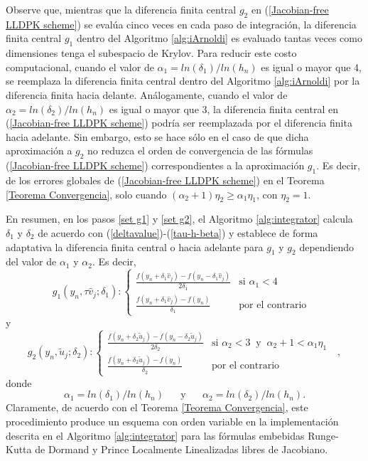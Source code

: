 Observe que, mientras que la diferencia finita central $g_2$ en (\ref{Jacobian-free LLDPK scheme}) se evalúa cinco veces en cada paso de integración, la diferencia finita central $g_1$ dentro del Algoritmo \ref{alg:iArnoldi} es evaluado tantas veces como dimensiones tenga el subespacio de Krylov. Para reducir este costo computacional, cuando el valor de $\alpha_1=ln(\delta_1)/ln(h_n)$ es igual o mayor que 4, se reemplaza la diferencia finita central dentro del Algoritmo \ref{alg:iArnoldi} por la diferencia finita hacia delante. Análogamente, cuando el valor de $\alpha_2=ln(\delta_2)/ln(h_n)$ es igual o mayor que 3, la diferencia finita central en (\ref{Jacobian-free LLDPK scheme}) podría ser reemplazada por el diferencia finita hacia adelante. Sin embargo, esto se hace sólo en el caso de que dicha aproximación a $g_2$ no reduzca el orden de convergencia de las fórmulas (\ref{Jacobian-free LLDPK scheme}) correspondientes a la aproximación $g_1$. Es decir, de los errores globales de (\ref{Jacobian-free LLDPK scheme}) en el Teorema \ref{Teorema Convergencia}, solo cuando $(\alpha_2+1)\eta_2 \ge \alpha_1\eta_1$, con $\eta_2=1$.

En resumen, en los pasos \ref{set g1} y \ref{set g2}, el Algoritmo \ref{alg:integrator} calcula $\delta_1$ y $\delta_2$ de acuerdo con (\ref{deltavalue})-(\ref{tau-h-beta}) y establece de forma adaptativa la diferencia finita central o hacia adelante para $g_1$ y $g_2$ dependiendo del valor de $\alpha_1$ y $\alpha_2$. Es decir,
\begin{equation} \label{g1}
	g_{1}(y_{n},\tau \widehat{v}_{j};\delta _{1}) : \left\{
	\begin{array}{cc}
	\frac{f(y_{n}+\delta _{1}\widehat{v}_{j})-f(y_{n}-\delta _{1}\widehat{v}_{j})%
	}{2\delta _{1}} & \text{si }\alpha _{1}<4 \\
	\frac{f(y_{n}+\delta _{1}\widehat{v}_{j})-f(y_{n})}{\delta _{1}} & \text{por el contrario}%
	\end{array}
	\text{ }\right.
\end{equation}
y
\begin{equation}  \label{g2}
	g_{2}(y_{n},\widetilde{u}_{j};\delta _{2}) : \left\{
	\begin{array}{cc}
	\frac{f(y_{n}+\delta _{2}\widetilde{u}_{j})-f(y_{n}-\delta _{2}\widetilde{u}%
		_{j})}{2\delta _{2}} & \text{si }\alpha _{2}<3 \;\;\text{y}\;\; \alpha_2+1 < \alpha_1\eta_1 \\
	\frac{f(y_{n}+\delta _{2}\widetilde{u}_{j})-f(y_{n})}{\delta _{2}} &
    \text{por el contrario}%
	\end{array}%
	\text{ }\right. ,
\end{equation}
donde
\begin{equation} \label{alpha_formulas}
    \alpha_1=ln(\delta_1)/ln(h_n) \;\;\;\;\;\; \text{y} \;\;\;\;\;\; \alpha_2=ln(\delta_2)/ln(h_n).
\end{equation}
Claramente, de acuerdo con el Teorema \ref{Teorema Convergencia}, este procedimiento produce un esquema con orden variable en la implementación descrita en el Algoritmo \ref{alg:integrator} para las fórmulas embebidas Runge-Kutta de Dormand y Prince Localmente Linealizadas libres de Jacobiano.

